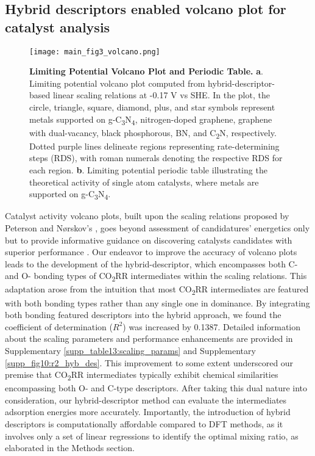 
\subsection{Hybrid descriptors enabled volcano plot for catalyst analysis}

\begin{figure}[htbp]
    \centering
    \texttt{[image: main\_fig3\_volcano.png]}
    \caption{\textbf{Limiting Potential Volcano Plot and Periodic Table.}
    \textbf{a}. Limiting potential volcano plot computed from hybrid-descriptor-based
    linear scaling relations at -0.17 V vs SHE.
    In the plot, the circle, triangle, square, diamond, plus, and star symbols represent metals supported on g-C\textsubscript{3}N\textsubscript{4}, nitrogen-doped graphene, graphene with dual-vacancy, black phosphorous, BN, and C\textsubscript{2}N, respectively.
    Dotted purple lines delineate regions representing rate-determining steps (RDS), with roman numerals denoting the respective RDS for each region.
    \textbf{b}. Limiting potential periodic table illustrating the theoretical activity of
    single atom catalysts, where metals are supported on g-C\textsubscript{3}N\textsubscript{4}.}
    \label{main_fig3:volcano}
\end{figure}

Catalyst activity volcano plots, built upon the scaling relations proposed by Peterson and Nørskov's \cite{peterson2012activity},
goes beyond assessment of candidatures' energetics only but to provide informative guidance on discovering catalysts candidates with superior performance \cite{balandin1969modern, deutschmann2000heterogeneous}.
Our endeavor to improve the accuracy of volcano plots leads to the development of the hybrid-descriptor,
which encompasses both C- and O- bonding types of CO\textsubscript{2}RR intermediates within the scaling relations.
This adaptation arose from the intuition that most CO\textsubscript{2}RR intermediates are featured with both bonding types rather than any single one in dominance.
By integrating both bonding featured descriptors into the hybrid approach, we found the coefficient of determination ($R^2$) was increased by 0.1387.
Detailed information about the scaling parameters and performance enhancements are provided in Supplementary \cref{supp_table13:scaling_params} and Supplementary \cref{supp_fig10:r2_hyb_des}.
This improvement to some extent underscored our premise that CO\textsubscript{2}RR intermediates typically exhibit chemical similarities encompassing both O- and C-type descriptors.
After taking this dual nature into consideration, our hybrid-descriptor method can evaluate the intermediates adsorption energies more accurately.
Importantly, the introduction of hybrid descriptors is computationally affordable compared to DFT methods,
as it involves only a set of linear regressions to identify the optimal mixing ratio, as elaborated in the Methods section.

